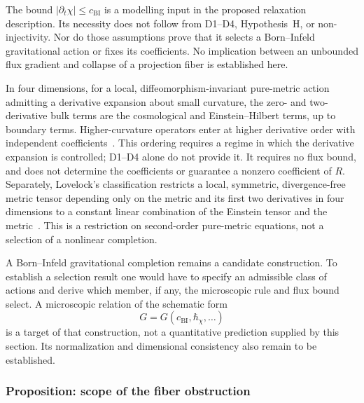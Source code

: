     \begin{remark}
      \label{lem:saturation-selects}
      The bound $|\partial_t\chi|\leq c_{\mathrm{BI}}$ is a modelling input in the proposed relaxation description.
      Its necessity does not follow from D1--D4, Hypothesis~H, or non-injectivity.
      Nor do those assumptions prove that it selects a Born--Infeld gravitational action or fixes its coefficients.
      No implication between an unbounded flux gradient and collapse of a projection fiber is established here.
    \end{remark}

    In four dimensions, for a local, diffeomorphism-invariant pure-metric action admitting a derivative expansion
    about small curvature, the zero- and two-derivative bulk terms are the cosmological and Einstein--Hilbert terms,
    up to boundary terms.
    Higher-curvature operators enter at higher derivative order with independent coefficients~\cite{Donoghue1994EFT}.
    This ordering requires a regime in which the derivative expansion is controlled; D1--D4 alone do not provide it.
    It requires no flux bound, and does not determine the coefficients or guarantee a nonzero coefficient of $R$.
    Separately, Lovelock's classification restricts a local, symmetric, divergence-free metric tensor depending
    only on the metric and its first two derivatives in four dimensions to a constant linear combination of
    the Einstein tensor and the metric~\cite{Lovelock1971,Lovelock1972}.
    This is a restriction on second-order pure-metric equations, not a selection of a nonlinear completion.

    A Born--Infeld gravitational completion remains a candidate construction.
    To establish a selection result one would have to specify an admissible class of actions and derive which
    member, if any, the microscopic rule and flux bound select.
    A microscopic relation of the schematic form
    \begin{equation}
      G = G(c_{\mathrm{BI}},\hbar_\chi,\ldots)
      \label{eq:G-prediction2}
    \end{equation}
    is a target of that construction, not a quantitative prediction supplied by this section.
    Its normalization and dimensional consistency also remain to be established.

  \subsubsection*{Proposition: scope of the fiber obstruction}
    \label{subsec:necessity-theorem}

